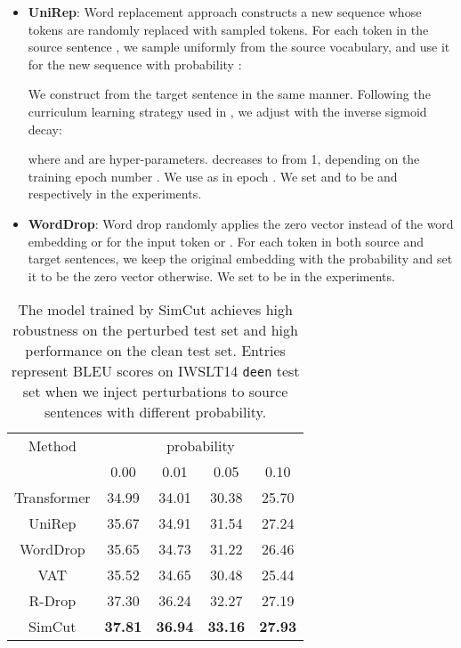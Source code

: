 \documentclass[11pt]{article}
\begin{document}
\begin{itemize}[leftmargin=*]

\item {\bf UniRep}: Word replacement approach constructs a new sequence whose tokens are randomly replaced with sampled tokens. For each token in the source sentence , we sample  uniformly from the source vocabulary, and use it for the new sequence  with probability :

We construct  from the target sentence  in the same manner. Following the curriculum learning strategy used in \citet{bengio2015scheduled}, we adjust  with the inverse sigmoid decay:

where  and  are hyper-parameters.  decreases to  from 1, depending on the training epoch number . We use  as  in epoch . We set  and  to be  and  respectively in the experiments.

\item {\bf WordDrop}: Word drop randomly applies the zero vector instead of the word embedding  or  for the input token  or  \cite{gal2016theoretically}. For each token in both source and target sentences, we keep the original embedding with the probability  and set it to be the zero vector otherwise. We set  to be  in the experiments.



\end{itemize}

\begin{table}
\centering
\begin{tabular}{c|c|c|c|c}
\hline
Method & \multicolumn{4}{|c}{probability} \\
 & 0.00 & 0.01 & 0.05 & 0.10 \\ \hline\hline
Transformer & 34.99 & 34.01 & 30.38 & 25.70 \\ UniRep & 35.67 & 34.91 & 31.54 & 27.24 \\ WordDrop & 35.65 & 34.73 & 31.22 & 26.46 \\ VAT & 35.52 & 34.65 & 30.48 & 25.44 \\ R-Drop & 37.30 & 36.24 & 32.27 & 27.19 \\ \hline
SimCut & \bf 37.81 & \bf 36.94 & \bf 33.16 & \bf 27.93 \\
\end{tabular}
\caption{\label{noisy}
The model trained by SimCut achieves high robustness on the perturbed test set and high performance on the clean test set. Entries represent BLEU scores on IWSLT14 \texttt{de}\texttt{en} test set when we inject perturbations to source sentences with different probability.
}
\end{table}
\end{document}
